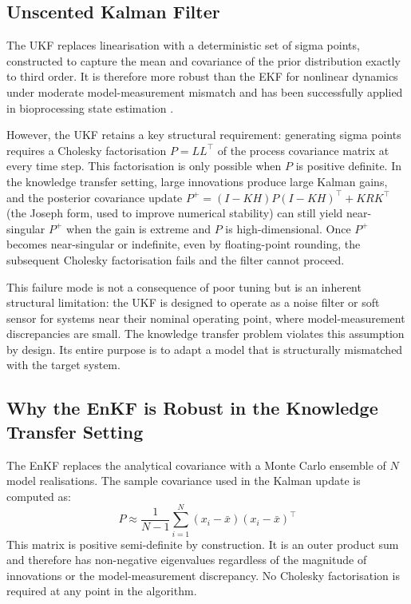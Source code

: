 {\subsection*{Unscented Kalman Filter}

The UKF replaces linearisation with a deterministic set of sigma points, constructed to capture the mean and covariance of the prior distribution exactly to third order. It is therefore more robust than the EKF for nonlinear dynamics under moderate model-measurement mismatch and has been successfully applied in bioprocessing state estimation \cite{Fernandes2015ExtendedCultures, Dewasme2015StateCells, Abadli2021AnCultures, Kramer2019AFilter}.

However, the UKF retains a key structural requirement: generating sigma points requires a Cholesky factorisation $P = LL^\top$ of the process covariance matrix at every time step. This factorisation is only possible when $P$ is positive definite. In the knowledge transfer setting, large innovations produce large Kalman gains, and the posterior covariance update $P^{+} = (I - KH)P(I - KH)^\top + KRK^\top$ (the Joseph form, used to improve numerical stability) can still yield near-singular $P^{+}$ when the gain is extreme and $P$ is high-dimensional. Once $P^{+}$ becomes near-singular or indefinite, even by floating-point rounding, the subsequent Cholesky factorisation fails and the filter cannot proceed.

This failure mode is not a consequence of poor tuning but is an inherent structural limitation: the UKF is designed to operate as a noise filter or soft sensor for systems near their nominal operating point, where model-measurement discrepancies are small. The knowledge transfer problem violates this assumption by design. Its entire purpose is to adapt a model that is structurally mismatched with the target system.

\subsection*{Why the EnKF is Robust in the Knowledge Transfer Setting}

The EnKF replaces the analytical covariance with a Monte Carlo ensemble of $N$ model realisations. The sample covariance used in the Kalman update is computed as:
\begin{equation}
    P \approx \frac{1}{N-1} \sum_{i=1}^{N} (x_i - \bar{x})(x_i - \bar{x})^\top
\end{equation}
This matrix is positive semi-definite by construction. It is an outer product sum and therefore has non-negative eigenvalues regardless of the magnitude of innovations or the model-measurement discrepancy. No Cholesky factorisation is required at any point in the algorithm.

}
